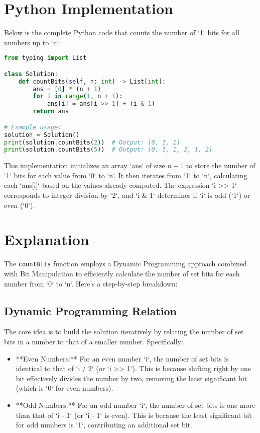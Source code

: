 \section*{Python Implementation}


Below is the complete Python code that counts the number of `1` bits for all numbers up to `n`:

\begin{fullwidth}
\begin{lstlisting}[language=Python]
from typing import List

class Solution:
    def countBits(self, n: int) -> List[int]:
        ans = [0] * (n + 1)
        for i in range(1, n + 1):
            ans[i] = ans[i >> 1] + (i & 1)
        return ans

# Example usage:
solution = Solution()
print(solution.countBits(2))  # Output: [0, 1, 1]
print(solution.countBits(5))  # Output: [0, 1, 1, 2, 1, 2]
\end{lstlisting}
\end{fullwidth}

This implementation initializes an array `ans` of size \(n + 1\) to store the number of `1` bits for each value from `0` to `n`. It then iterates from `1` to `n`, calculating each `ans[i]` based on the values already computed. The expression `i >> 1` corresponds to integer division by `2`, and `i \& 1` determines if `i` is odd (`1`) or even (`0`).

\section*{Explanation}

The \texttt{countBits} function employs a Dynamic Programming approach combined with Bit Manipulation to efficiently calculate the number of set bits for each number from `0` to `n`. Here's a step-by-step breakdown:

\subsection*{Dynamic Programming Relation}

The core idea is to build the solution iteratively by relating the number of set bits in a number to that of a smaller number. Specifically:

\begin{itemize}
    \item **Even Numbers:** For an even number `i`, the number of set bits is identical to that of `i / 2` (or `i >> 1`). This is because shifting right by one bit effectively divides the number by two, removing the least significant bit (which is `0` for even numbers).
    
    \item **Odd Numbers:** For an odd number `i`, the number of set bits is one more than that of `i - 1` (or `i - 1` is even). This is because the least significant bit for odd numbers is `1`, contributing an additional set bit.
\end{itemize}

